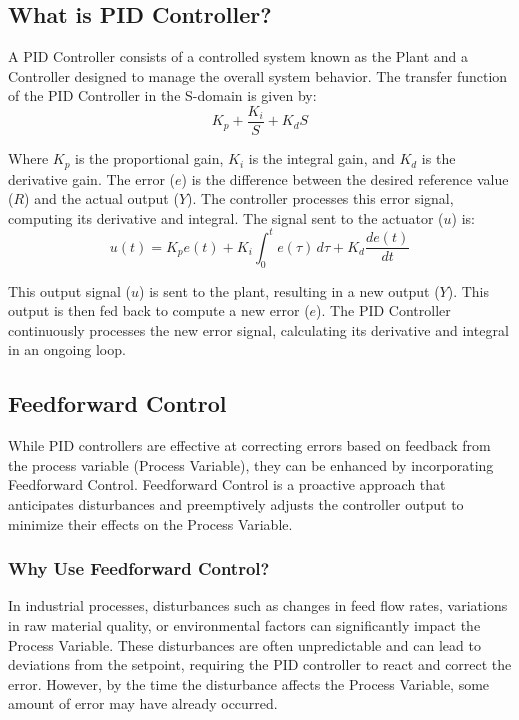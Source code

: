 \subsection{What is PID Controller?}
A PID Controller consists of a controlled system known as the Plant and a
Controller designed to manage the overall system behavior. The transfer
function of the PID Controller in the S-domain is given by:
\begin{equation*}
    K_p + \frac{K_i}{S}+K_d S
\end{equation*}

Where $K_p$ is the proportional gain, $K_i$ is the integral gain, and $K_d$ is
the derivative gain. The error ($e$) is the difference between the desired
reference value ($R$) and the actual output ($Y$). The controller processes
this error signal, computing its derivative and integral. The signal sent to
the actuator ($u$) is:
\begin{equation*}
    u(t) = K_p e(t) + K_i \int_{0}^{t} e(\tau) \, d\tau + K_d \frac{de(t)}{dt}
\end{equation*}

This output signal ($u$) is sent to the plant, resulting in a new output ($Y$).
This output is then fed back to compute a new error ($e$). The PID Controller
continuously processes the new error signal, calculating its derivative and
integral in an ongoing loop.

\subsection{Feedforward Control}

While PID controllers are effective at correcting errors based on feedback from
the process variable (Process Variable), they can be enhanced by incorporating
Feedforward Control. Feedforward Control is a proactive approach that
anticipates disturbances and preemptively adjusts the controller output to
minimize their effects on the Process Variable.

\subsubsection{Why Use Feedforward Control?}

In industrial processes, disturbances such as changes in feed flow rates,
variations in raw material quality, or environmental factors can significantly
impact the Process Variable. These disturbances are often unpredictable and can
lead to deviations from the setpoint, requiring the PID controller to react and
correct the error. However, by the time the disturbance affects the Process
Variable, some amount of error may have already occurred.\\

